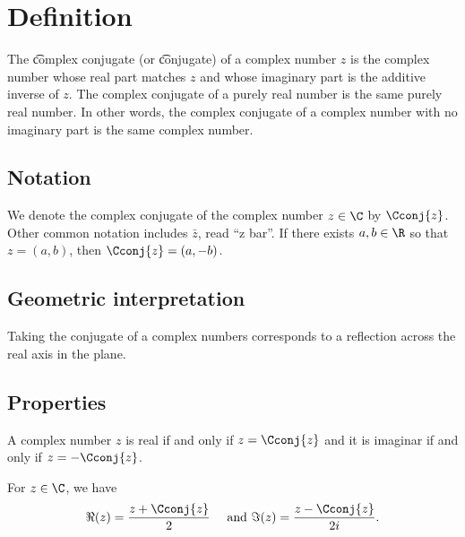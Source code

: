 
\section*{Definition}

The \t{complex conjugate} (or \t{conjugate}) of a complex number $z$ is the complex number whose real part matches $z$ and whose imaginary part is the additive inverse of $z$.
The complex conjugate of a purely real number is the same purely real number.
In other words, the complex conjugate of a complex number with no imaginary part is the same complex number.

\subsection*{Notation}

We denote the complex conjugate of the complex number $z \in \C $ by $\Cconj{z}$.
Other common notation includes $\bar{z}$, read ``z bar''.
If there exists $a, b \in \R $ so that $z = (a, b)$, then $\Cconj{z} = (a, -b)$.

\subsection*{Geometric interpretation}

Taking the conjugate of a complex numbers corresponds to a reflection across the real axis in the plane.

\subsection*{Properties}

A complex number $z$ is real if and only if $z = \Cconj{z}$ and it is imaginar if and only if $z = -\Cconj{z}$.

\begin{proposition}
For $z \in \C $, we have
\[
\Re (z) = \frac{z + \Cconj{z}}{2} \quad \text{ and } \Im (z) = \frac{z - \Cconj{z}}{2i}.
\]
\end{proposition}

\blankpage